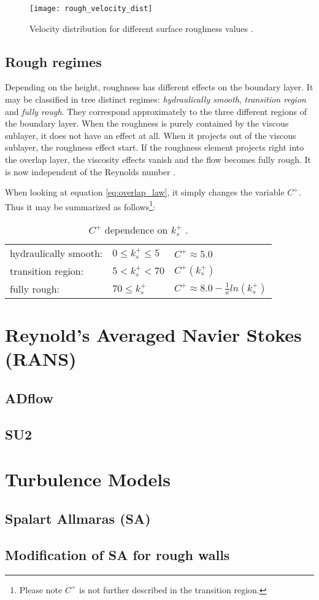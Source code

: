 \begin{figure}[H] \centering
\texttt{[image: rough\_velocity\_dist]}
    \caption{Velocity distribution for different surface roughness values \cite{Schlichting2018}.}
    \label{fig:rough_velocity_dist}
\end{figure}


\subsection{Rough regimes}
Depending on the height, roughness has different effects on the boundary layer.
It may be classified in tree distinct regimes: \textit{hydraulically smooth},
\textit{transition region} and \textit{fully rough}. They correspond
approximately to the three different regions of the boundary layer. When the
roughness is purely contained by the viscous sublayer, it does not have an
effect at all. When it projects out of the viscous sublayer, the roughness
effect start. If the roughness element projects right into the overlap layer,
the viscosity effects vanish and the flow becomes fully rough. It is now
independent of the Reynolds number \cite{Schlichting2018}.


When looking at equation \ref{eq:overlap_law}, it simply changes the variable
$C^{+}$. Thus it may be summarized as follows\footnote{Please note $C^{+}$ is
not further described in the transition region.}:

\begin{table}[H]
  \centering
  \begin{tabular}{l l l}
    hydraulically smooth:   & $0 \leq k_{s}^{+} \leq 5$   & $C^{+} \approx 5.0$\\
    transition region:      & $ 5 < k_{s}^{+} < 70$       & $C^{+}(k_{s}^{+})$\\
    fully rough:            & $70 \leq k_{s}^{+}$         & $C^{+} \approx 8.0 - \frac{1}{\kappa} ln(k_{s}^{+})$
  \end{tabular}
  \caption{$C^{+}$ dependence on $k_{s}^{+}$ \cite{Schlichting2018}.}
  \label{tab:opt_prob}
\end{table}

\section{Reynold's Averaged Navier Stokes (RANS)}

\subsection{ADflow}

\subsection{SU2}



\section{Turbulence Models}


\subsection{Spalart Allmaras (SA)}


\subsection{Modification of SA for rough walls}
